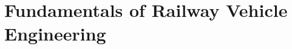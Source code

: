 \section{Fundamentals of Railway Vehicle Engineering}
\label{sec:FundamentalsOfRailwayVehicleEngineering}

